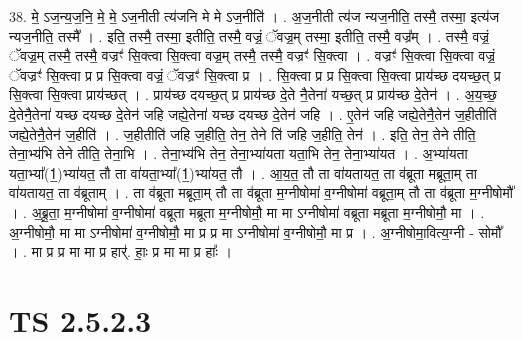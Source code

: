 \documentclass[17pt]{extarticle}
\begin{document}
38. मे॒ ऽज॒न्य॒ज॒नि॒ मे॒ मे॒ ऽज॒नीती त्य॑जनि मे मे ऽज॒नीति॑ । . अ॒ज॒नीती त्य॑ज न्यज॒नीति॒ तस्मै॒ तस्मा॒ इत्य॑ज न्यज॒नीति॒ तस्मै᳚ । . इति॒ तस्मै॒ तस्मा॒ इतीति॒ तस्मै॒ वज्रं॒ ॅवज्र॒म् तस्मा॒ इतीति॒ तस्मै॒ वज्र᳚म् । . तस्मै॒ वज्रं॒ ॅवज्र॒म् तस्मै॒ तस्मै॒ वज्रꣳ॑ सि॒क्त्वा सि॒क्त्वा वज्र॒म् तस्मै॒ तस्मै॒ वज्रꣳ॑ सि॒क्त्वा । . वज्रꣳ॑ सि॒क्त्वा सि॒क्त्वा वज्रं॒ ॅवज्रꣳ॑ सि॒क्त्वा प्र प्र सि॒क्त्वा वज्रं॒ ॅवज्रꣳ॑ सि॒क्त्वा प्र । . सि॒क्त्वा प्र प्र सि॒क्त्वा सि॒क्त्वा प्राय॑च्छ दयच्छ॒त् प्र सि॒क्त्वा सि॒क्त्वा प्राय॑च्छत् । . प्राय॑च्छ दयच्छ॒त् प्र प्राय॑च्छ दे॒ते नै॒तेना॑ यच्छ॒त् प्र प्राय॑च्छ दे॒तेन॑ । . अ॒य॒च्छ॒ दे॒तेनै॒तेना॑ यच्छ दयच्छ दे॒तेन॑ जहि जह्ये॒तेना॑ यच्छ दयच्छ दे॒तेन॑ जहि । . ए॒तेन॑ जहि जह्ये॒तेनै॒तेन॑ ज॒हीतीति॑ जह्ये॒तेनै॒तेन॑ ज॒हीति॑ । . ज॒हीतीति॑ जहि ज॒हीति॒ तेन॒ तेने ति॑ जहि ज॒हीति॒ तेन॑ । . इति॒ तेन॒ तेने तीति॒ तेना॒भ्य॑भि तेने तीति॒ तेना॒भि । . तेना॒भ्य॑भि तेन॒ तेना॒भ्या॑यता यता॒भि तेन॒ तेना॒भ्या॑यत । . अ॒भ्या॑यता यता॒भ्या᳚(1॒)भ्या॑यत॒ तौ ता वा॑यता॒भ्या᳚(1॒)भ्या॑यत॒ तौ । . आ॒य॒त॒ तौ ता वा॑यतायत॒ ता व॑ब्रूता मब्रूता॒म् ता वा॑यतायत॒ ता व॑ब्रूताम् । . ता व॑ब्रूता मब्रूता॒म् तौ ता व॑ब्रूता म॒ग्नीषोमा॑ व॒ग्नीषोमा॑ वब्रूता॒म् तौ ता व॑ब्रूता म॒ग्नीषोमौ᳚ । . अ॒ब्रू॒ता॒ म॒ग्नीषोमा॑ व॒ग्नीषोमा॑ वब्रूता मब्रूता म॒ग्नीषोमौ॒ मा मा ऽग्नीषोमा॑ वब्रूता मब्रूता म॒ग्नीषोमौ॒ मा । . अ॒ग्नीषोमौ॒ मा मा ऽग्नीषोमा॑ व॒ग्नीषोमौ॒ मा प्र प्र मा ऽग्नीषोमा॑ व॒ग्नीषोमौ॒ मा प्र । . अ॒ग्नीषोमा॒वित्य॒ग्नी - सोमौ᳚ । . मा प्र प्र मा मा प्र हार्॑. हाः॒ प्र मा मा प्र हाः᳚ । \newline
\pagebreak
{}

\section{ TS 2.5.2.3 }
\end{document}
